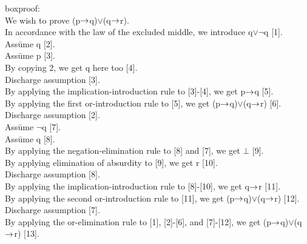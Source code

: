 \begin{tabbing}
boxproof:\\
We wish to prove (p\(\rightarrow\)q)\(\lor\)(q\(\rightarrow\)r).\\
In accordance with the law of the excluded middle, we introduce q\(\lor\)\(\neg\)q [1].\\
Ass\=ume \+ q [2].\\ 
	Ass\=ume \+ p [3].\\
		By copying 2, we get q here too [4].\\
	\< \- Discharge assumption [3].\\
	By applying the implication-introduction rule to [3]-[4], we get p\(\rightarrow\)q [5].\\
	By applying the first or-introduction rule to [5], we get (p\(\rightarrow\)q)\(\lor\)(q\(\rightarrow\)r) [6].\\
\< \- Discharge assumption [2].\\
Ass\=ume \+ \(\neg\)q [7].\\
	Ass\=ume \+ q [8].\\
		By applying the negation-elimination rule to [8] and [7], we get \(\bot\) [9].\\
		By applying elimination of absurdity to [9], we get r [10].\\
	\< \- Discharge assumption [8].\\
	By applying the implication-introduction rule to [8]-[10], we get q\(\rightarrow\)r [11].\\
	By applying the second or-introduction rule to [11], we get (p\(\rightarrow\)q)\(\lor\)(q\(\rightarrow\)r) [12].\\
\< \- Discharge assumption [7].\\
By applying the or-elimination rule to [1], [2]-[6], and [7]-[12], we get (p\(\rightarrow\)q)\(\lor\)(q\(\rightarrow\)r) [13].\\
\end{tabbing}
